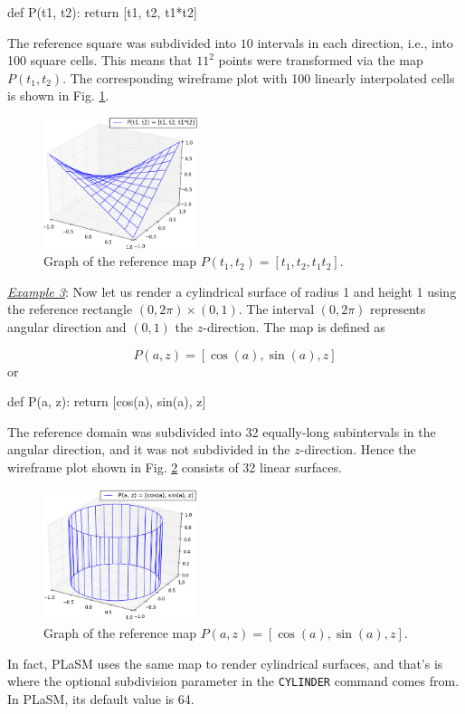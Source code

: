 \begin{bluecode}
def P(t1, t2):
    return [t1, t2, t1*t2]
\end{bluecode}
The reference square was subdivided into $10$ intervals in each direction, i.e., into 
100 square cells. This means that $11^2$ points were transformed via the map $P(t_1, t_2)$.
The corresponding wireframe plot with 100 linearly interpolated cells is shown in Fig. \ref{fig:paramsu1c}. 

\begin{figure}[!ht]
\begin{center}
\includegraphics[width=0.4\textwidth]{img/paramsu1c.png}
\end{center}
\vspace{-6mm}
\caption{Graph of the reference map $P(t_1, t_2) = [t_1, t_2, t_1 t_2]$.}
\label{fig:paramsu1c}
\end{figure}
\noindent
\noindent
\underline{\em Example 3}: Now let us render a cylindrical surface 
of radius 1 and height 1 using the reference rectangle $(0, 2\pi)\times(0, 1)$. 
The interval $(0, 2\pi)$ represents angular direction and $(0, 1)$ the $z$-direction. 
The map is defined as

$$
P(a, z) = [\cos(a), \sin(a), z]
$$
or

\begin{bluecode}
def P(a, z):
    return [cos(a), sin(a), z]
\end{bluecode}
The reference domain was subdivided into 32 equally-long subintervals in the angular direction,
and it was not subdivided in the $z$-direction. Hence the wireframe plot shown in 
Fig. \ref{fig:paramsu20} consists of 32 linear surfaces. 
\newpage
\begin{figure}[!ht]
\begin{center}
\includegraphics[width=0.4\textwidth]{img/paramsu20.png}
\end{center}
\vspace{-6mm}
\caption{Graph of the reference map $P(a, z) = [\cos(a), \sin(a), z]$.}
\label{fig:paramsu20}
\end{figure}
\noindent
In fact, PLaSM uses the same map to render cylindrical surfaces, and that's
is where the optional subdivision parameter in the {\tt CYLINDER} command comes from.
In PLaSM, its default value is 64. 

